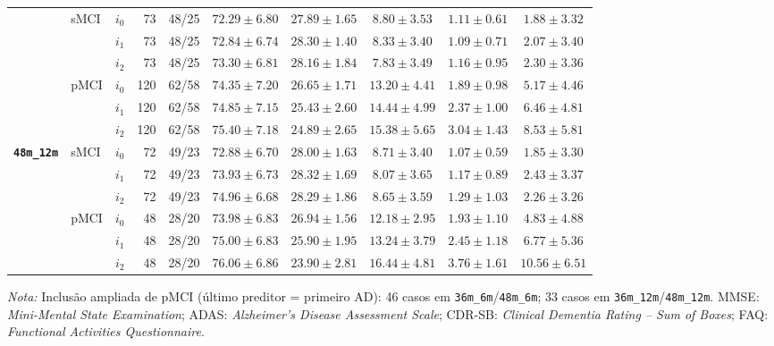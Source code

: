 \documentclass[review]{elsarticle}
\newcommand{\code}[1]{\texttt{#1}}
\begin{document}
\begin{table}[H]
{\begin{tabular}{lllrrccccc}
				& \multirow{3}{*}{sMCI}
				& $i_0$ & 73 & 48/25 & $72.29\pm6.80$ & $27.89\pm1.65$ & $8.80\pm3.53$ & $1.11\pm0.61$ & $1.88\pm3.32$ \\
				& & $i_1$ & 73 & 48/25 & $72.84\pm6.74$ & $28.30\pm1.40$ & $8.33\pm3.40$ & $1.09\pm0.71$ & $2.07\pm3.40$ \\
				& & $i_2$ & 73 & 48/25 & $73.30\pm6.81$ & $28.16\pm1.84$ & $7.83\pm3.49$ & $1.16\pm0.95$ & $2.30\pm3.36$ \\
				\cmidrule{2-10}
				& \multirow{3}{*}{pMCI}
				& $i_0$ & 120 & 62/58 & $74.35\pm7.20$ & $26.65\pm1.71$ & $13.20\pm4.41$ & $1.89\pm0.98$ & $5.17\pm4.46$ \\
				& & $i_1$ & 120 & 62/58 & $74.85\pm7.15$ & $25.43\pm2.60$ & $14.44\pm4.99$ & $2.37\pm1.00$ & $6.46\pm4.81$ \\
				& & $i_2$ & 120 & 62/58 & $75.40\pm7.18$ & $24.89\pm2.65$ & $15.38\pm5.65$ & $3.04\pm1.43$ & $8.53\pm5.81$ \\
				\midrule
				\multirow{6}{*}{\textbf{\code{48m\_12m}}}
				& \multirow{3}{*}{sMCI}
				& $i_0$ & 72 & 49/23 & $72.88\pm6.70$ & $28.00\pm1.63$ & $8.71\pm3.40$ & $1.07\pm0.59$ & $1.85\pm3.30$ \\
				& & $i_1$ & 72 & 49/23 & $73.93\pm6.73$ & $28.32\pm1.69$ & $8.07\pm3.65$ & $1.17\pm0.89$ & $2.43\pm3.37$ \\
				& & $i_2$ & 72 & 49/23 & $74.96\pm6.68$ & $28.29\pm1.86$ & $8.65\pm3.59$ & $1.29\pm1.03$ & $2.26\pm3.26$ \\
				\cmidrule{2-10}
				& \multirow{3}{*}{pMCI}
				& $i_0$ & 48 & 28/20 & $73.98\pm6.83$ & $26.94\pm1.56$ & $12.18\pm2.95$ & $1.93\pm1.10$ & $4.83\pm4.88$ \\
				& & $i_1$ & 48 & 28/20 & $75.00\pm6.83$ & $25.90\pm1.95$ & $13.24\pm3.79$ & $2.45\pm1.18$ & $6.77\pm5.36$ \\
				& & $i_2$ & 48 & 28/20 & $76.06\pm6.86$ & $23.90\pm2.81$ & $16.44\pm4.81$ & $3.76\pm1.61$ & $10.56\pm6.51$ \\
				\bottomrule
			\end{tabular}%
		}
		\begin{flushleft}
			\footnotesize
			\textit{Nota:} Inclusão ampliada de pMCI (último preditor = primeiro AD): 46 casos em \code{36m\_6m}/\code{48m\_6m}; 33 casos em \code{36m\_12m}/\code{48m\_12m}. MMSE: \textit{Mini-Mental State Examination}; ADAS: \textit{Alzheimer's Disease Assessment Scale}; CDR-SB: \textit{Clinical Dementia Rating -- Sum of Boxes}; FAQ: \textit{Functional Activities Questionnaire}. 
		\end{flushleft}
	\end{table}
	
\end{document}
